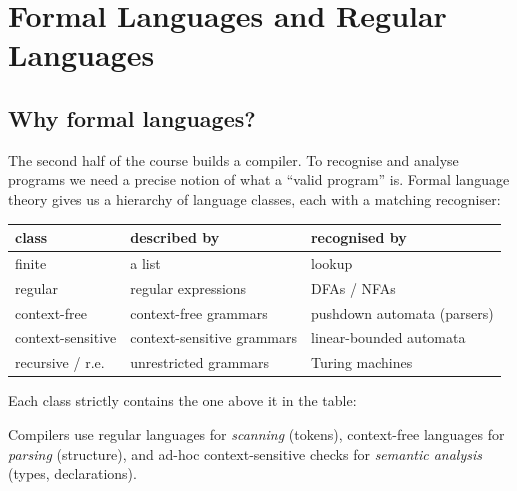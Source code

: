 \chapter{Formal Languages and Regular Languages}

\section{Why formal languages?}

The second half of the course builds a compiler. To recognise and analyse programs we need a
precise notion of what a ``valid program'' is. Formal language theory gives us a hierarchy of
language classes, each with a matching recogniser:

\begin{center}
\begin{tabular}{lll}
\toprule
class & described by & recognised by \\
\midrule
finite & a list & lookup \\
regular & regular expressions & DFAs / NFAs \\
context-free & context-free grammars & pushdown automata (parsers) \\
context-sensitive & context-sensitive grammars & linear-bounded automata \\
recursive / r.e. & unrestricted grammars & Turing machines \\
\bottomrule
\end{tabular}
\end{center}

Each class strictly contains the one above it in the table:
\begin{center}
\end{center}

Compilers use regular languages for \emph{scanning} (tokens), context-free languages for
\emph{parsing} (structure), and ad-hoc context-sensitive checks for \emph{semantic analysis}
(types, declarations).

